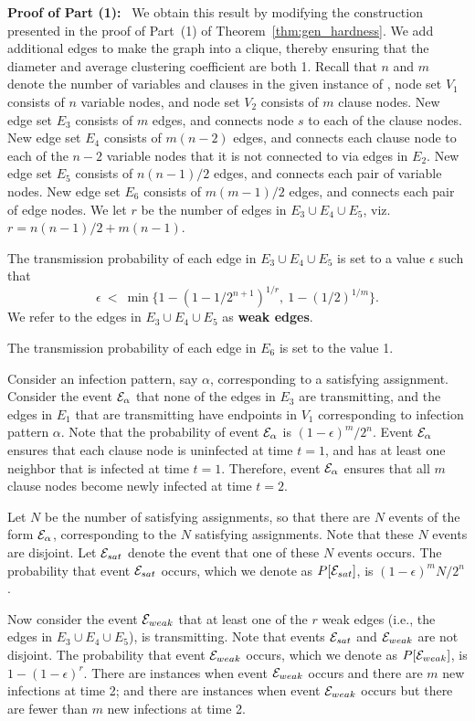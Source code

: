 \noindent
\textbf{Proof of Part (1):}~ We obtain this result by modifying
the construction presented in the proof of Part~(1) 
of Theorem~\ref{thm:gen_hardness}.
We add additional edges to make the graph into a clique, 
thereby ensuring that  the diameter and average clustering coefficient are both 1.
Recall that $n$ and $m$ denote the number of variables and clauses
in the given instance of \mtsat,
node set $V_1$ consists of $n$ variable nodes,
and node set $V_2$ consists of $m$ clause nodes.
New edge set $E_3$ consists of $m$ edges, and connects node $s$ to each of the clause nodes.
New edge set $E_4$ consists of $m(n-2)$ edges, 
and connects each clause node to each of the $n-2$ variable nodes 
that it is not connected to via edges in $E_2$.
New edge set $E_5$ consists of $n(n-1)/2$ edges, and connects each pair of variable nodes.
New edge set $E_6$ consists of $m(m-1)/2$ edges, and connects each pair of edge nodes.
We let $r$  be the number of edges in $E_3 \cup E_4 \cup E_5$, viz. $r = n(n-1)/2 + m(n-1)$.

The transmission probability of each edge in $E_3 \cup E_4 \cup E_5$ 
is set to a value $\epsilon$ such that 
\[
\epsilon ~<~ \min\{1 - (1 - 1/{2^{n+1}})^{1/r},~ 1 - (1/2)^{1/m}\}.
\]
We refer to the edges in $E_3 \cup E_4 \cup E_5$ as {\bf weak edges}.

The transmission probability of each edge in $E_6$ is set to the value 1.

Consider an infection pattern, say $\alpha$,
corresponding to a satisfying assignment.
Consider the event ${\cal E}_{\alpha}$ that none of the 
edges in $E_3$ are transmitting,
and the edges in $E_1$ that are transmitting 
have endpoints in $V_1$ corresponding to infection pattern $\alpha$.
Note that the probability of event ${\cal E}_{\alpha}$ is $(1 -  \epsilon)^m/{2^n}$.
Event ${\cal E}_{\alpha}$ ensures that each
clause node is uninfected at time $t=1$,
and has at least one neighbor that is infected at time $t =1$.  
Therefore, event ${\cal E}_{\alpha}$ ensures
that all $m$ clause nodes become newly infected at time $t = 2$.  

Let $N$ be the number of satisfying assignments, 
so that there are $N$ events of the form ${\cal E}_{\alpha}$,
corresponding to the $N$ satisfying assignments.
Note that these $N$ events are disjoint.
Let ${\cal E}_{sat}$ denote the event that one of these $N$ events occurs.
The probability that event ${\cal E}_{sat}$ occurs,
which we denote as  $P[{\cal E}_{sat}]$, is $(1 -  \epsilon)^m N/2^n$.

Now consider the event ${\cal E}_{weak}$ that at least one of the $r$ weak edges
(i.e., the edges in $E_3 \cup E_4 \cup E_5$), is transmitting.
Note that events ${\cal E}_{sat}$ and ${\cal E}_{weak}$ are not disjoint.
The probability that event ${\cal E}_{weak}$ occurs,
which we denote as  $P[{\cal E}_{weak}]$, is $1 -(1 -  \epsilon)^r$.
There are instances when event ${\cal E}_{weak}$ occurs 
and there are $m$ new infections at time 2;
and there are instances when event ${\cal E}_{weak}$ occurs 
but there are fewer than $m$ new infections at time 2.

